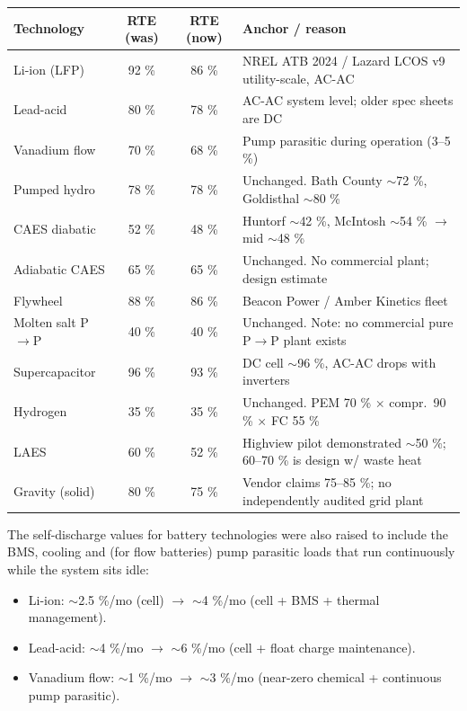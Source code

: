 \begin{footnotesize}
\begin{tabular}{|l|c|c|l|}
\hline
\textbf{Technology} & \textbf{RTE (was)} & \textbf{RTE (now)}
  & \textbf{Anchor / reason} \\
\hline
Li-ion (LFP)        & 92 \% & 86 \% & NREL ATB 2024 / Lazard LCOS v9 utility-scale, AC-AC \\
Lead-acid           & 80 \% & 78 \% & AC-AC system level; older spec sheets are DC \\
Vanadium flow       & 70 \% & 68 \% & Pump parasitic during operation (3--5 \%) \\
Pumped hydro        & 78 \% & 78 \% & Unchanged. Bath County $\sim$72 \%, Goldisthal $\sim$80 \% \\
CAES diabatic       & 52 \% & 48 \% & Huntorf $\sim$42 \%, McIntosh $\sim$54 \% $\to$ mid $\sim$48 \% \\
Adiabatic CAES      & 65 \% & 65 \% & Unchanged. No commercial plant; design estimate \\
Flywheel            & 88 \% & 86 \% & Beacon Power / Amber Kinetics fleet \\
Molten salt P$\to$P & 40 \% & 40 \% & Unchanged. Note: no commercial pure P$\to$P plant exists \\
Supercapacitor      & 96 \% & 93 \% & DC cell $\sim$96 \%, AC-AC drops with inverters \\
Hydrogen            & 35 \% & 35 \% & Unchanged. PEM 70 \% $\times$ compr.\ 90 \% $\times$ FC 55 \% \\
LAES                & 60 \% & 52 \% & Highview pilot demonstrated $\sim$50 \%; 60--70 \% is design w/ waste heat \\
Gravity (solid)     & 80 \% & 75 \% & Vendor claims 75--85 \%; no independently audited grid plant \\
\hline
\end{tabular}
\end{footnotesize}

The self-discharge values for battery technologies were also raised
to include the BMS, cooling and (for flow batteries) pump parasitic
loads that run continuously while the system sits idle:

\begin{itemize}
    \item Li-ion: $\sim$2.5 \%/mo (cell) $\to$ $\sim$4 \%/mo
    (cell + BMS + thermal management).
    \item Lead-acid: $\sim$4 \%/mo $\to$ $\sim$6 \%/mo
    (cell + float charge maintenance).
    \item Vanadium flow: $\sim$1 \%/mo $\to$ $\sim$3 \%/mo
    (near-zero chemical + continuous pump parasitic).
\end{itemize}

